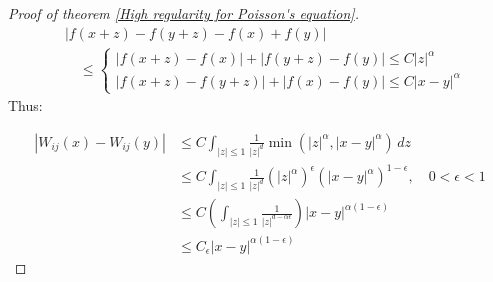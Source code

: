 \documentclass{report}
\theoremstyle{tommy}
\begin{document}
\begin{proof}[Proof of theorem \ref{High regularity for Poisson's equation}]
    \begin{align*}
      &|f(x+z) - f(y+z) - f(x) + f(y)| \\
      &\quad\le 
      \begin{cases}
        |f(x+z) - f(x)| + |f(y+z)-f(y)| \le C|z|^\alpha \\
        |f(x+z) - f(y+z)| + |f(x) - f(y)| \le C|x-y|^\alpha
      \end{cases}
    \end{align*}
    Thus: 
    
    \begin{align*}
      |W_{ij}(x) - W_{ij}(y)| 
      &\le C \int_{|z| \le 1} \frac{1}{|z|^d} \min(|z|^\alpha, |x-y|^\alpha) \, dz \\
      &\le C \int_{|z| \le 1} \frac{1}{|z|^d} (|z|^\alpha)^\epsilon (|x-y|^\alpha)^{1-\epsilon}, \quad 0 < \epsilon < 1 \\
      &\le C \left(\int_{|z| \le 1} \frac{1}{|z|^{d-\alpha \epsilon}}\right)|x-y|^{\alpha(1-\epsilon)} \\
      &\le C_\epsilon |x-y|^{\alpha (1 - \epsilon)}
    \end{align*}


\end{proof}
\end{document}
